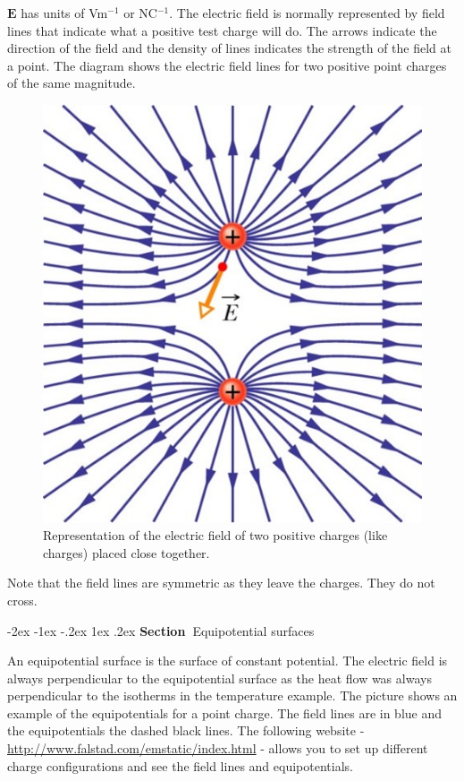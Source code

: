 \documentclass[
]{book}
\makeatletter
\renewcommand\section{%
\@startsection{section}{1}{\z@}%
              {-2ex \@plus -1ex \@minus -.2ex}%
              {1ex \@plus .2ex}%
              {\sffamily\bfseries\large\noindent Section~}}
\numberwithin{equation}{section}
\makeatother
\begin{document}
\(\mathbf{E}\) has units of Vm\(^{-1}\) or NC\(^{-1}\). The electric field is normally
represented by field lines that indicate what a positive test charge
will do. The arrows indicate the direction of the field and the density
of lines indicates the strength of the field at a point. The diagram
shows the electric field lines for two positive point charges of the
same magnitude.

\begin{figure}

{\centering \includegraphics[width=0.7\linewidth]{Figures/Efield_like} 

}

\caption{Representation of the electric field of two positive charges (like charges) placed close together.}\label{fig:EfieldLike}
\end{figure}

Note that the field lines are symmetric as they leave the charges. They
do not cross.

\hypertarget{equipotential-surfaces}{%
\section{Equipotential surfaces}\label{equipotential-surfaces}}

An equipotential surface is the surface of constant potential. The
electric field is always perpendicular to the equipotential surface as
the heat flow was always perpendicular to the isotherms in the
temperature example. The picture shows an example of the equipotentials
for a point charge. The field lines are in blue and the equipotentials
the dashed black lines. The following website -
\url{http://www.falstad.com/emstatic/index.html} - allows you to set up
different charge configurations and see the field lines and
equipotentials.
\end{document}
